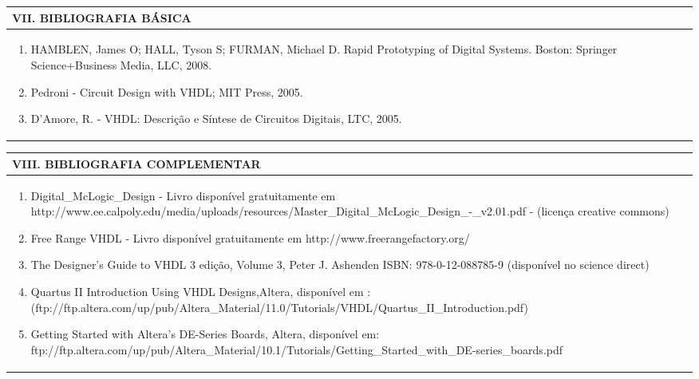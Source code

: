 \documentclass[12pt]{article}
\begin{document}
\newpage


\begin{longtable}{|L{1.025\textwidth}|} \hline
%
{\bf VII. BIBLIOGRAFIA BÁSICA} \\ \hline

\begin{enumerate}
\item HAMBLEN, James O; HALL, Tyson S; FURMAN, Michael D. Rapid Prototyping of Digital Systems. Boston: Springer Science+Business Media, LLC, 2008. 
\item Pedroni - Circuit Design with VHDL; MIT Press, 2005. 
\item D'Amore, R. - VHDL: Descrição e Síntese de Circuitos Digitais, LTC, 2005.


\end{enumerate}
 \\ \hline
\end{longtable}



\begin{longtable}{|L{1.025\textwidth}|} \hline
%
{\bf VIII. BIBLIOGRAFIA COMPLEMENTAR} \\ \hline
\begin{enumerate}
\item  Digital\_McLogic\_Design - Livro disponível gratuitamente em http://www.ee.calpoly.edu/media/uploads/resources/Master\_Digital\_McLogic\_Design\_-\_v2.01.pdf - (licença creative commons) 
\item Free Range VHDL - Livro disponível gratuitamente em http://www.freerangefactory.org/ 
\item The Designer's Guide to VHDL 3 edição, Volume 3, Peter J. Ashenden ISBN: 978-0-12-088785-9 (disponível no science direct) 
\item Quartus II Introduction Using VHDL Designs,Altera, disponível em :(ftp://ftp.altera.com/up/pub/Altera\_Material/11.0/Tutorials/VHDL/Quartus\_II\_Introduction.pdf) 
\item Getting Started with Altera's DE-Series Boards, Altera, disponível em: ftp://ftp.altera.com/up/pub/Altera\_Material/10.1/Tutorials/Getting\_Started\_with\_DE-series\_boards.pdf

\end{enumerate}
 \\ \hline
\end{longtable}



\end{document}
